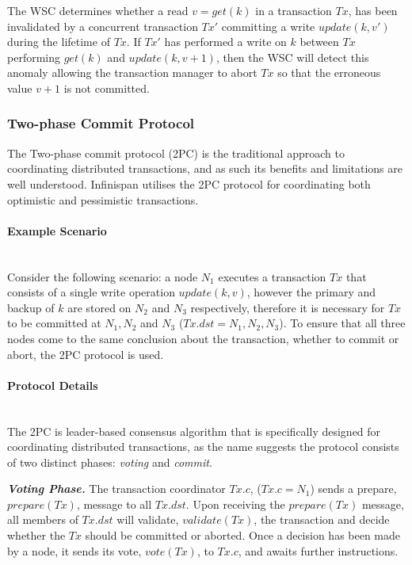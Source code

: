 	        The WSC determines whether a read $v = get(k)$ in a transaction $Tx$, has been invalidated by a concurrent transaction $Tx'$ committing a write $update(k, v')$ during the lifetime of $Tx$.  If $Tx'$ has performed a write on $k$ between $Tx$ performing $get(k)$ and $update(k, v+1)$, then the WSC will detect this anomaly allowing the transaction manager to abort $Tx$ so that the erroneous value $v+1$ is not committed.  

        
	    \subsubsection{Two-phase Commit Protocol}
	       The Two-phase commit protocol (2PC)\citep{Bernstein:1996:PTP:261193} is the traditional approach to coordinating distributed transactions, and as such its benefits and limitations are well understood.  Infinispan utilises the 2PC protocol for coordinating both optimistic and pessimistic transactions.  
	       
           \paragraph{Example Scenario} \label{transaction_scenario} \hspace{0pt} \\	       
           Consider the following scenario: a node $N_1$ executes a transaction $Tx$ that consists of a single write operation $update(k, v)$, however the primary and backup of $k$ are stored on $N_2$ and $N_3$ respectively, therefore it is necessary for $Tx$ to be committed at $N_1, N_2$ and $N_3$ ($Tx.dst = N_1, N_2, N_3$).  To ensure that all three nodes come to the same conclusion about the transaction, whether to commit or abort, the 2PC protocol is used.  
	       
	       \paragraph{Protocol Details} \hspace{0pt} \\
	       The 2PC is leader-based consensus algorithm that is specifically designed for coordinating distributed transactions, as the name suggests the protocol consists of two distinct phases: \emph{voting} and \emph{commit}. 
	       
	       \textbf{\emph{Voting Phase.}} The transaction coordinator $Tx.c$, ($Tx.c = N_1$) sends a prepare, $prepare(Tx)$, message to all $Tx.dst$.  Upon receiving the $prepare(Tx)$ message, all members of $Tx.dst$ will validate, $validate(Tx)$, the transaction and decide whether the $Tx$ should be committed or aborted.  Once a decision has been made by a node, it sends its vote, $vote(Tx)$, to $Tx.c$, and awaits further instructions.  
	       
